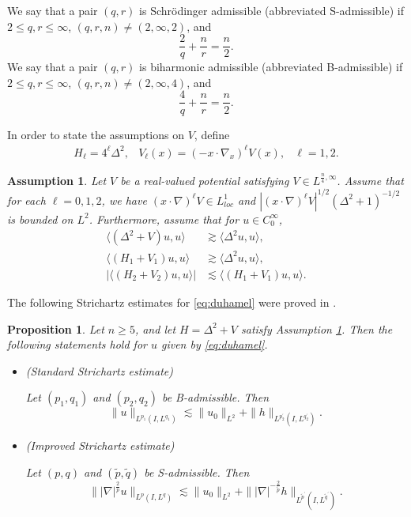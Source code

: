\documentclass[11pt,a4paper]{article}
\numberwithin{equation}{section}
\newtheorem{proposition}[theorem]{Proposition}
\newtheorem{assumption}[theorem]{Assumption}
\begin{document}
We say that a pair $(q, r)$ is Schr\"{o}dinger admissible (abbreviated S-admissible) if $2 \leq q, r \leq \infty$, $(q, r, n) \neq (2, \infty, 2)$, and
\[ \dfrac{2}{q} + \dfrac{n}{r} = \dfrac{n}{2}. \]
We say that a pair $(q, r)$ is biharmonic admissible (abbreviated B-admissible) if $2 \leq q, r \leq \infty$, $(q, r, n) \neq (2, \infty, 4)$, and
\[ \dfrac{4}{q} + \dfrac{n}{r} = \dfrac{n}{2}. \]

In order to state the assumptions on $V$, define
\begin{equation}
\begin{array}{lcr}
H_{\ell} = 4^{\ell}\Delta^{2}, & V_{\ell}(x) = (-x\cdot \nabla_{x})^{\ell}V(x), & \ell = 1, 2.
\end{array}
\end{equation}
\begin{assumption}\label{as:strichartz}
Let $V$ be a real-valued potential satisfying $V \in L^{\frac{n}{4}, \infty}$. Assume that for each $\ell = 0, 1, 2$, we have $(x\cdot \nabla)^{\ell}V \in L^{1}_{loc}$ and $|(x\cdot \nabla)^{\ell}V|^{1/2}(\Delta^{2} + 1)^{-1/2}$ is bounded on $L^{2}$. Furthermore, assume that for $u \in C_{0}^{\infty}$,
\begin{align}
  \langle (\Delta^{2} + V)u, u \rangle &\gtrsim \langle \Delta^{2}u, u \rangle, \\
  \langle (H_{1} + V_{1})u, u \rangle &\gtrsim \langle \Delta^{2}u, u \rangle, \\
  |\langle (H_{2} + V_{2})u, u \rangle| &\lesssim \langle (H_{1} + V_{1})u, u \rangle.
\end{align}
\end{assumption}

The following Strichartz estimates for \eqref{eq:duhamel} were proved in \cite{Miz}.
\begin{proposition}\label{prop:strichartz}
Let $n \geq 5$, and let $H = \Delta^{2} + V$ satisfy Assumption \ref{as:strichartz}. Then the following statements hold for $u$ given by \eqref{eq:duhamel}.
\begin{itemize}
\item (Standard Strichartz estimate)

Let $(p_{1}, q_{1})$ and $(p_{2}, q_{2})$ be B-admissible. Then
\begin{equation}\label{standard}
\|u\|_{L^{p_{1}}(I, L^{q_{1}})} \lesssim \|u_{0}\|_{L^{2}} + \|h\|_{L^{p_{2}^{\prime}}(I, L^{q_{2}^{\prime}})}.
\end{equation}
\item (Improved Strichartz estimate)

Let $(p, q)$ and $(\tilde{p}, \tilde{q})$ be S-admissible. Then
\begin{equation}\label{improved}
\| |\nabla|^{\frac{2}{p}}u\|_{L^{p}(I, L^{q})} \lesssim \|u_{0}\|_{L^{2}} + \||\nabla|^{-\frac{2}{\tilde{p}}}h\|_{L^{\tilde{p}^{\prime}}(I, L^{\tilde{q}^{\prime}})}.
\end{equation}
\end{itemize}
\end{proposition}
\end{document}
